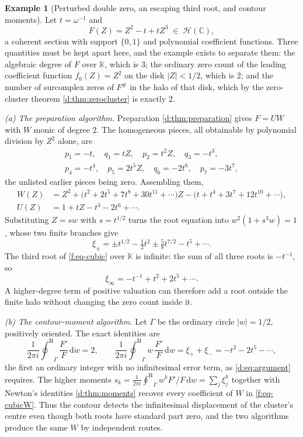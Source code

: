 \documentclass[11pt,a4paper]{article}
\numberwithin{equation}{section}
\theoremstyle{definition}
\newtheorem{example}[theorem]{Example}
\theoremstyle{remark}
\theoremstyle{plain}
\newcommand{\K}{\mathbb K}
\newcommand{\CC}{\mathbb C}
\newcommand{\ev}[1]{#1^{\#}}
\newcommand{\Hc}{\mathcal H}
\newcommand{\ointH}{{\oint^{\mathrm H}}}
\newcommand{\abs}[1]{\lvert #1\rvert}
\newcommand{\dd}{\mathrm d}
\begin{document}
\begin{example}[Perturbed double zero, an escaping third root, and
contour moments]\label{f:ex-cubic}
Let $t=\omega^{-1}$ and
\begin{equation}\label{f:eq-cubic}
 F(Z)=Z^{2}-t+tZ^{3}\;\in\;\Hc(\CC),
\end{equation}
a coherent section with support $\{0,1\}$ and polynomial coefficient
functions.  Three quantities must be kept apart here, and the example
exists to separate them: the algebraic degree of $F$ over $\K$, which is
$3$; the ordinary zero count of the leading coefficient function
$f_{0}(Z)=Z^{2}$ on the disk $\abs Z<1/2$, which is $2$; and the number
of surcomplex zeros of $\ev F$ in the halo of that disk, which by the
zero-cluster theorem \ref{d:thm:zerocluster} is exactly $2$.

\smallskip
\emph{(a) The preparation algorithm.}  Preparation
\ref{d:thm:preparation} gives $F=UW$ with $W$ monic of degree $2$.  The
homogeneous pieces, all obtainable by polynomial division by $Z^{2}$
alone, are
\[
 \begin{gathered}
 p_1=-t,\quad q_1=tZ,\quad p_2=t^2Z,\quad q_3=-t^3,\\
 p_4=-t^4,\quad p_5=2t^5Z,\quad q_6=-2t^6,\quad p_7=-3t^7,
 \end{gathered}
\]
the unlisted earlier pieces being zero.  Assembling them,
\begin{align}
 W(Z)&=Z^{2}+\bigl(t^{2}+2t^{5}+7t^{8}+30t^{11}+\cdots\bigr)Z
      -\bigl(t+t^{4}+3t^{7}+12t^{10}+\cdots\bigr),
      \label{f:eq-cubicW}\\
 U(Z)&=1+tZ-t^{3}-2t^{6}+\cdots .\label{f:eq-cubicU}
\end{align}
Substituting $Z=sw$ with $s=t^{1/2}$ turns the root equation into
$w^{2}(1+s^{3}w)=1$, whose two finite branches give
\begin{equation}\label{f:eq-cubicroots}
 \xi_{\pm}=\pm t^{1/2}-\tfrac12t^{2}\pm\tfrac58t^{7/2}-t^{5}+\cdots .
\end{equation}
The third root of \eqref{f:eq-cubic} over $\K$ is infinite: the sum of
all three roots is $-t^{-1}$, so
\[
 \xi_{\infty}=-t^{-1}+t^{2}+2t^{5}+\cdots .
\]
A higher-degree term of positive valuation can therefore add a root
outside the finite halo without changing the zero count inside it.

\smallskip
\emph{(b) The contour-moment algorithm.}  Let $\Gamma$ be the ordinary
circle $\abs w=1/2$, positively oriented.  The exact identities are
\[
 \frac1{2\pi i}\ointH_{\Gamma}\frac{F'}{F}\,\dd w=2,
 \qquad
 \frac1{2\pi i}\ointH_{\Gamma}w\,\frac{F'}{F}\,\dd w
 =\xi_{+}+\xi_{-}=-t^{2}-2t^{5}-\cdots,
\]
the first an ordinary integer with no infinitesimal error term, as
\ref{d:eq:argument} requires.  The higher moments
$s_{k}=\frac1{2\pi i}\ointH_{\Gamma}w^{k}F'/F\,\dd w=\sum_{j}\xi_{j}^{k}$
together with Newton's identities \ref{d:thm:moments} recover every
coefficient of $W$ in \eqref{f:eq-cubicW}.  Thus the contour detects the
infinitesimal displacement of the cluster's centre even though both
roots have standard part zero, and the two algorithms produce the same
$W$ by independent routes.
\end{example}
\end{document}
